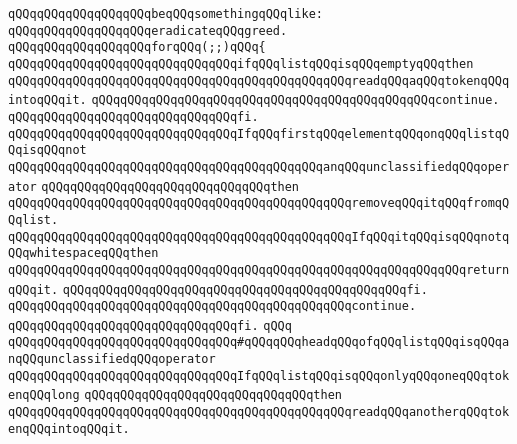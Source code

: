 \verb|qQQqqQQqqQQqqQQqqQQqbeqQQqsomethingqQQqlike:|\newline
\newline
\verb|qQQqqQQqqQQqqQQqqQQqeradicateqQQqgreed.|\newline
\newline
\verb|qQQqqQQqqQQqqQQqqQQqforqQQq(;;)qQQq{|\newline
\newline
\verb|qQQqqQQqqQQqqQQqqQQqqQQqqQQqqQQqifqQQqlistqQQqisqQQqemptyqQQqthen|\newline
\verb|qQQqqQQqqQQqqQQqqQQqqQQqqQQqqQQqqQQqqQQqqQQqqQQqreadqQQqaqQQqtokenqQQqintoqQQqit.|\newline
\verb|qQQqqQQqqQQqqQQqqQQqqQQqqQQqqQQqqQQqqQQqqQQqqQQqcontinue.|\newline
\verb|qQQqqQQqqQQqqQQqqQQqqQQqqQQqqQQqfi.|\newline
\newline
\verb|qQQqqQQqqQQqqQQqqQQqqQQqqQQqqQQqIfqQQqfirstqQQqelementqQQqonqQQqlistqQQqisqQQqnot|\newline
\verb|qQQqqQQqqQQqqQQqqQQqqQQqqQQqqQQqqQQqqQQqqQQqanqQQqunclassifiedqQQqoperator|\newline
\verb|qQQqqQQqqQQqqQQqqQQqqQQqqQQqqQQqthen|\newline
\verb|qQQqqQQqqQQqqQQqqQQqqQQqqQQqqQQqqQQqqQQqqQQqqQQqremoveqQQqitqQQqfromqQQqlist.|\newline
\verb|qQQqqQQqqQQqqQQqqQQqqQQqqQQqqQQqqQQqqQQqqQQqqQQqIfqQQqitqQQqisqQQqnotqQQqwhitespaceqQQqthen|\newline
\verb|qQQqqQQqqQQqqQQqqQQqqQQqqQQqqQQqqQQqqQQqqQQqqQQqqQQqqQQqqQQqqQQqreturnqQQqit.|\newline
\verb|qQQqqQQqqQQqqQQqqQQqqQQqqQQqqQQqqQQqqQQqqQQqqQQqfi.|\newline
\verb|qQQqqQQqqQQqqQQqqQQqqQQqqQQqqQQqqQQqqQQqqQQqqQQqcontinue.|\newline
\verb|qQQqqQQqqQQqqQQqqQQqqQQqqQQqqQQqfi.|\newline
\verb|qQQq|\newline
\verb|qQQqqQQqqQQqqQQqqQQqqQQqqQQqqQQq#qQQqqQQqheadqQQqofqQQqlistqQQqisqQQqanqQQqunclassifiedqQQqoperator|\newline
\newline
\verb|qQQqqQQqqQQqqQQqqQQqqQQqqQQqqQQqIfqQQqlistqQQqisqQQqonlyqQQqoneqQQqtokenqQQqlong|\newline
\verb|qQQqqQQqqQQqqQQqqQQqqQQqqQQqqQQqthen|\newline
\verb|qQQqqQQqqQQqqQQqqQQqqQQqqQQqqQQqqQQqqQQqqQQqqQQqreadqQQqanotherqQQqtokenqQQqintoqQQqit.|\newline
